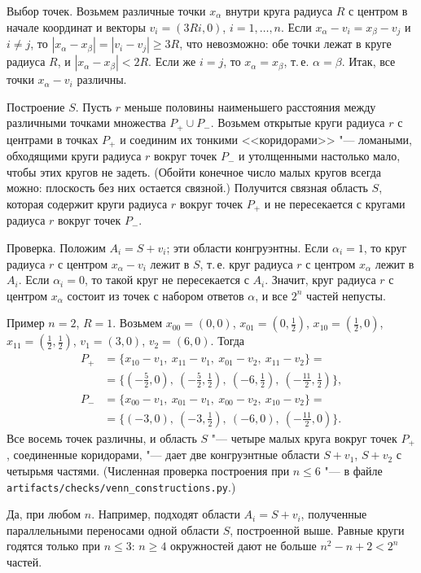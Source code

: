 \begin{solution}[3 (\S\,2)]
Выбор точек. Возьмем различные точки $x_\alpha$ внутри круга радиуса $R$
с центром в начале координат и векторы $v_i=(3Ri,0)$, $i=1,\dots,n$. Если
$x_\alpha-v_i=x_\beta-v_j$ и $i\ne j$, то $|x_\alpha-x_\beta|=|v_i-v_j|\ge3R$,
что невозможно: обе точки лежат в круге радиуса $R$, и
$|x_\alpha-x_\beta|<2R$. Если же $i=j$, то $x_\alpha=x_\beta$, т.\,е.
$\alpha=\beta$. Итак, все точки $x_\alpha-v_i$ различны.

Построение $S$. Пусть $r$ меньше половины наименьшего расстояния между
различными точками множества $P_+\cup P_-$. Возьмем открытые круги
радиуса $r$ с центрами в точках $P_+$ и соединим их тонкими
<<коридорами>> "--- ломаными, обходящими круги радиуса $r$ вокруг точек
$P_-$ и утолщенными настолько мало, чтобы этих кругов не задеть. (Обойти
конечное число малых кругов всегда можно: плоскость без них остается
связной.) Получится связная область $S$, которая содержит круги радиуса $r$
вокруг точек $P_+$ и не пересекается с кругами радиуса $r$ вокруг точек
$P_-$.

Проверка. Положим $A_i=S+v_i$; эти области конгруэнтны. Если $\alpha_i=1$,
то круг радиуса $r$ с центром $x_\alpha-v_i$ лежит в $S$, т.\,е. круг
радиуса $r$ с центром $x_\alpha$ лежит в $A_i$. Если $\alpha_i=0$, то такой
круг не пересекается с $A_i$. Значит, круг радиуса $r$ с центром $x_\alpha$
состоит из точек с набором ответов $\alpha$, и все $2^n$ частей непусты.

Пример $n=2$, $R=1$. Возьмем $x_{00}=(0,0)$, $x_{01}=(0,\tfrac12)$,
$x_{10}=(\tfrac12,0)$, $x_{11}=(\tfrac12,\tfrac12)$, $v_1=(3,0)$,
$v_2=(6,0)$. Тогда
\begin{align*}
P_+&=\{x_{10}-v_1,\ x_{11}-v_1,\ x_{01}-v_2,\ x_{11}-v_2\}={}\\
&=\{(-\tfrac52,0),\ (-\tfrac52,\tfrac12),\ (-6,\tfrac12),\ (-\tfrac{11}2,\tfrac12)\},\\
P_-&=\{x_{00}-v_1,\ x_{01}-v_1,\ x_{00}-v_2,\ x_{10}-v_2\}={}\\
&=\{(-3,0),\ (-3,\tfrac12),\ (-6,0),\ (-\tfrac{11}2,0)\}.
\end{align*}
Все восемь точек различны, и область $S$ "--- четыре малых круга вокруг
точек $P_+$, соединенные коридорами, "--- дает две конгруэнтные области
$S+v_1$, $S+v_2$ с четырьмя частями. (Численная проверка построения при
$n\le6$ "--- в файле \texttt{artifacts/checks/venn\_constructions.py}.)

\answer Да, при любом $n$. Например, подходят области $A_i=S+v_i$,
полученные параллельными переносами одной области $S$, построенной выше.
Равные круги годятся только при $n\le3$: $n\ge4$ окружностей дают не
больше $n^2-n+2<2^n$ частей.
\end{solution}
